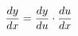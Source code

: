 \documentclass[preview]{standalone}
\begin{document}
\begin{align*}
{dy \over dx} = {dy \over du} \cdot {du \over dx}
\end{align*}
\end{document}
